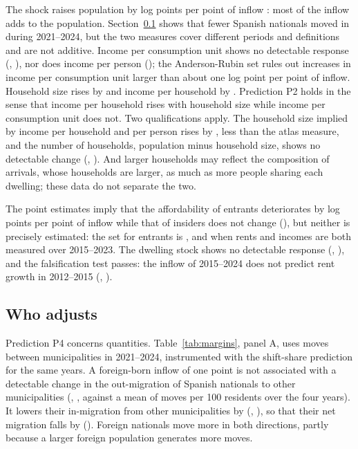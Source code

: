 \documentclass[11pt,a4paper]{article}
\begin{document}


The shock raises population by \bPop{} log points per point of inflow \bPopAR: most of the inflow adds to the population. Section~\ref{sec:who} shows that fewer Spanish nationals moved in during 2021--2024, but the two measures cover different periods and definitions and are not additive. Income per consumption unit shows no detectable response (\bUc, \bUcAR), nor does income per person (\bPp); the Anderson-Rubin set rules out increases in income per consumption unit larger than about one log point per point of inflow. Household size rises by \bHs{} \bHsAR{} and income per household by \bHh{} \bHhAR. Prediction P2 holds in the sense that income per household rises with household size while income per consumption unit does not. Two qualifications apply. The household size implied by income per household and per person rises by \bSi{} \bSiAR, less than the atlas measure, and the number of households, population minus household size, shows no detectable change (\bHn, \bHnAR). And larger households may reflect the composition of arrivals, whose households are larger, as much as more people sharing each dwelling; these data do not separate the two.

The point estimates imply that the affordability of entrants deteriorates by \bAE{} log points per point of inflow while that of insiders does not change (\bAI), but neither is precisely estimated: the set for entrants is \bAEAR, and \bAEtt{} \bAEttAR{} when rents and incomes are both measured over 2015--2023. The dwelling stock shows no detectable response (\bViv, \bVivAR), and the falsification test passes: the inflow of 2015--2024 does not predict rent growth in 2012--2015 (\bPre, \bPreAR).

\subsection{Who adjusts}\label{sec:who}

Prediction P4 concerns quantities. Table~\ref{tab:margins}, panel A, uses moves between municipalities in 2021--2024, instrumented with the shift-share prediction for the same years. A foreign-born inflow of one point is not associated with a detectable change in the out-migration of Spanish nationals to other municipalities (\flOutSp, \flOutSpAR, against a mean of \flOutSpM{} moves per 100 residents over the four years). It lowers their in-migration from other municipalities by \flInSpAbs{} (\flInSp, \flInSpAR), so that their net migration falls by \flNetSpAbs{} (\flNetSpAR). Foreign nationals move more in both directions, partly because a larger foreign population generates more moves.
\end{document}
